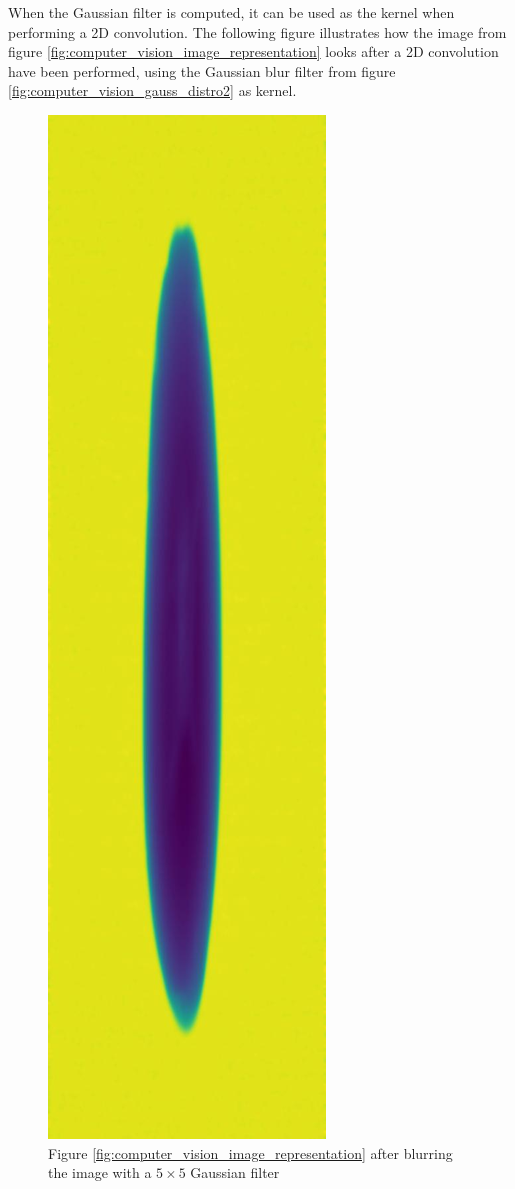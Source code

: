 \documentclass[11pt]{article}
\begin{document}
When the Gaussian filter is computed, it can be used as the kernel when performing a 2D convolution. The following figure illustrates how the image from figure \ref{fig:computer_vision_image_representation} looks after a 2D convolution have been performed, using the Gaussian blur filter from figure \ref{fig:computer_vision_gauss_distro2} as kernel.

\begin{figure}[!h]
    \centering
    \includegraphics[scale=0.22]{figurer/computer_vision/report_hollow_33_3.jpg}
    \caption{Figure \ref{fig:computer_vision_image_representation} after blurring the image with a $5 \times 5$ Gaussian filter}
    \label{fig:computer_vision_edge_detection_step_1}
\end{figure}
\end{document}
